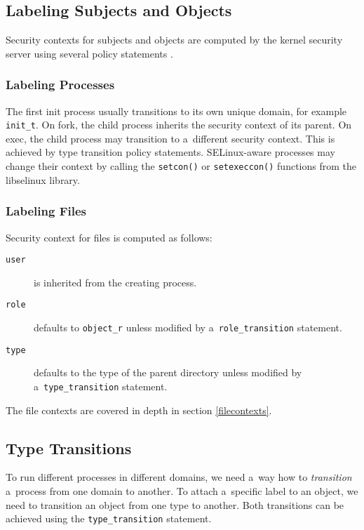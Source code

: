 \subsection{Labeling Subjects and Objects}
Security contexts for subjects and objects are computed by the kernel security
server using several policy statements \cite[pp.~31--33]{tsn}.

\subsubsection{Labeling Processes}
The first init process usually transitions to its own unique domain, for example
\texttt{init\_t}. On fork, the child process inherits the security context of
its parent. On exec, the child process may transition to a~different security
context. This is achieved by type transition policy statements. SELinux-aware
processes may change their context by calling the \texttt{setcon()} or
\texttt{setexeccon()} functions from the libselinux library.

\subsubsection{Labeling Files}
Security context for files is computed as follows:
\begin{description}
    \item [\texttt{user}] is inherited from the creating process.
    \item [\texttt{role}] defaults to \texttt{object\_r} unless modified by
        a~\texttt{role\_transition} statement.
    \item [\texttt{type}] defaults to the type of the parent directory unless
        modified by a~\texttt{type\_transition} statement.
\end{description}
The file contexts are covered in depth in section \ref{filecontexts}.

\subsection{Type Transitions}
\label{typetransitions}
To run different processes in different domains, we need a~way how to
\emph{transition} a~process from one domain to another. To attach a~specific
label to an object, we need to transition an object from one type to another.
Both transitions can be achieved using the \texttt{type\_transition} statement.

